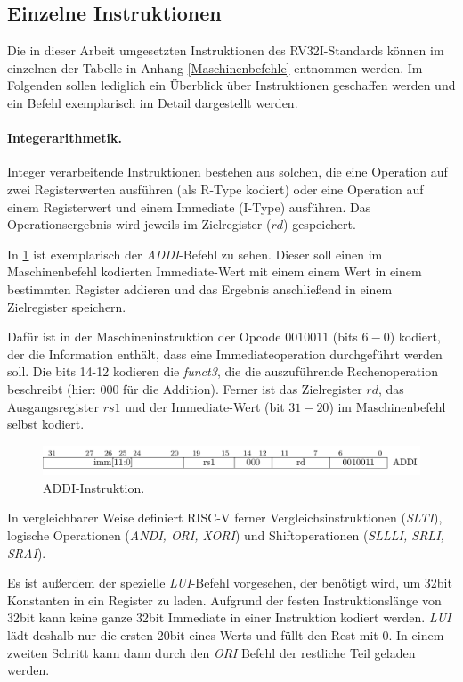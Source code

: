 \subsection{Einzelne Instruktionen}
Die in dieser Arbeit umgesetzten Instruktionen des RV32I-Standards können im einzelnen der Tabelle in Anhang \ref{Maschinenbefehle} entnommen werden. Im Folgenden sollen lediglich ein Überblick über Instruktionen geschaffen werden und ein Befehl exemplarisch im Detail dargestellt werden.

\paragraph{Integerarithmetik.}
Integer verarbeitende Instruktionen bestehen aus solchen, die eine Operation auf zwei Registerwerten ausführen (als R-Type kodiert) oder eine Operation auf einem Registerwert und einem Immediate (I-Type) ausführen. Das Operationsergebnis wird jeweils im Zielregister ($rd$) gespeichert.

In \ref{fig:addi} ist exemplarisch der \textit{ADDI}-Befehl zu sehen. Dieser soll einen im Maschinenbefehl kodierten Immediate-Wert mit einem einem Wert in einem bestimmten Register addieren und das Ergebnis anschließend in einem Zielregister speichern.
 
Dafür ist in der Maschineninstruktion der Opcode $0010011$ (bits $6 - 0$) kodiert, der die Information enthält, dass eine Immediateoperation durchgeführt werden soll. Die bits 14-12 kodieren die \textit{funct3}, die die auszuführende Rechenoperation beschreibt (hier: $000$ für die Addition). Ferner ist das Zielregister $rd$, das Ausgangsregister $rs1$ und der Immediate-Wert (bit $31 - 20$) im Maschinenbefehl selbst kodiert.

\begin{figure} [ht]
  \centering
  \includegraphics[width=\textwidth]{Figures/ADDI}
  \caption{ADDI-Instruktion.}
  \label{fig:addi}
\end{figure}

In vergleichbarer Weise definiert RISC-V ferner Vergleichsinstruktionen (\textit{SLTI}), logische Operationen (\textit{ANDI, ORI, XORI}) und Shiftoperationen (\textit{SLLLI, SRLI, SRAI}). 

Es ist außerdem der spezielle \textit{LUI}-Befehl vorgesehen, der benötigt wird, um 32bit Konstanten in ein Register zu laden. Aufgrund der festen Instruktionslänge von 32bit kann keine ganze 32bit Immediate in einer Instruktion kodiert werden. \textit{LUI} lädt deshalb nur die ersten 20bit eines Werts und füllt den Rest mit $0$. In einem zweiten Schritt kann dann durch den \textit{ORI} Befehl der restliche Teil geladen werden.


